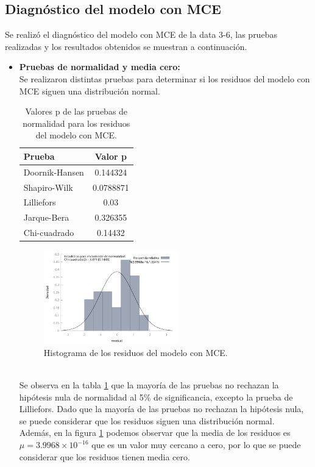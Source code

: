 \documentclass[12pt]{article}
\begin{document}
\subsection*{Diagnóstico del modelo con MCE}
Se realizó el diagnóstico del modelo con MCE de la data 3-6, las pruebas realizadas y los resultados obtenidos se muestran a continuación.
\begin{itemize}
    \item \textbf{Pruebas de normalidad y media cero:}\\
    Se realizaron distintas pruebas para determinar si los residuos del modelo con MCE siguen una distribución normal.\\
    \begin{table}[h!]
    \centering
    \begin{tabular}{lc}
        \toprule
        Prueba & Valor p \\
        \midrule
        Doornik-Hansen & 0.144324 \\
        Shapiro-Wilk & 0.0788871 \\
        Lilliefors & 0.03 \\
        Jarque-Bera & 0.326355 \\
        Chi-cuadrado & 0.14432 \\
        \bottomrule
    \end{tabular}
    \caption{Valores p de las pruebas de normalidad para los residuos del modelo con MCE.} 
    \label{tab:residuos_normalidad}
    \end{table}
    \begin{figure}[h!]
        \centering
        \includegraphics[width=0.55\textwidth]{imagenes/hist_res.pdf}
        \caption{Histograma de los residuos del modelo con MCE.}
        \label{fig:residuos_hist}
    \end{figure}\\
    Se observa en la tabla \ref{tab:residuos_normalidad} que la mayoría de las pruebas no 
    rechazan la hipótesis nula de normalidad al 5\% de significancia, excepto la prueba de Lilliefors.
    Dado que la mayoría de las pruebas no rechazan la hipótesis nula, se puede considerar que los residuos 
    siguen una distribución normal.\\
    Además, en la figura \ref{fig:residuos_hist} podemos observar que la media de los residuos es
    $\mu = 3.9968 \times 10^{-16}$ que es un valor muy cercano a cero, por lo que se puede considerar que los residuos
    tienen media cero.


\end{itemize}
\end{document}
